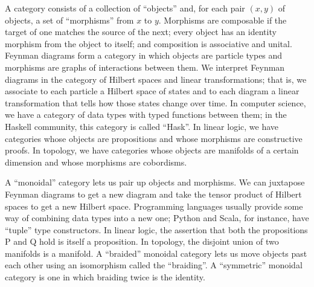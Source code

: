 \documentclass[12pt,twoside,openright]{report}
\begin{document}
A category consists of a collection of ``objects'' and, for each pair $(x, y)$ of objects, a set of ``morphisms'' from $x$ to $y$.  Morphisms are composable if the target of one matches the source of the next; every object has an identity morphism from the object to itself; and composition is associative and unital.  Feynman diagrams form a category in which objects are particle types and morphisms are graphs of interactions between them.  We interpret Feynman diagrams in the category of Hilbert spaces and linear transformations; that is, we associate to each particle a Hilbert space of states and to each diagram a linear transformation that tells how those states change over time.  In computer science, we have a category of data types with typed functions between them; in the Haskell community, this category is called ``Hask''.  In linear logic, we have categories whose objects are propositions and whose morphisms are constructive proofs.  In topology, we have categories whose objects are manifolds of a certain dimension and whose morphisms are cobordisms.

A ``monoidal'' category lets us pair up objects and morphisms.  We can juxtapose Feynman diagrams to get a new diagram and take the tensor product of Hilbert spaces to get a new Hilbert space.  Programming languages usually provide some way of combining data types into a new one; Python and Scala, for instance, have ``tuple'' type constructors.  In linear logic, the assertion that both the propositions P and Q hold is itself a proposition.  In topology, the disjoint union of two manifolds is a manifold.  A ``braided'' monoidal category lets us move objects past each other using an isomorphism called the ``braiding''.  A ``symmetric'' monoidal category is one in which braiding twice is the identity.
\end{document}
